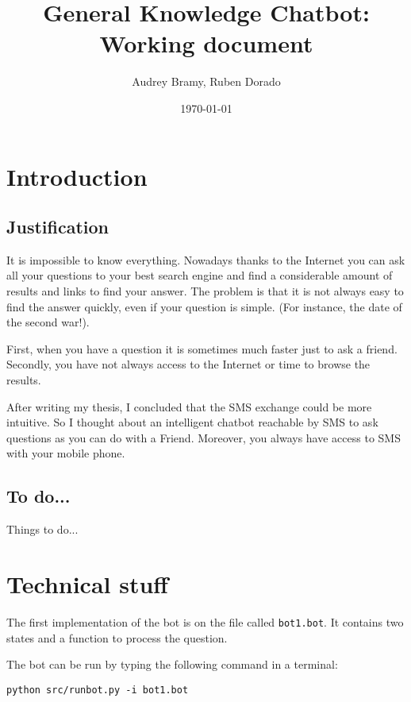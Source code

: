 \documentclass[11pt]{article}
\title{\textbf{General Knowledge Chatbot: Working document}}
\author{Audrey Bramy, Ruben Dorado}
\date{\today}
\begin{document}
\maketitle


\section{Introduction}


\subsection{Justification}

It is impossible to know everything. Nowadays thanks to the Internet you can ask all your questions to your best search engine and find a considerable amount of results and links to find your answer. The problem is that it is not always easy to find the answer quickly, even if your question is simple.
(For instance, the date of the second war!).

First, when you have a question it is sometimes much faster just to ask a friend. Secondly, you have not always access to the Internet or time to browse the results.

After writing my thesis, I concluded that the SMS exchange could be more intuitive. So I thought about an intelligent chatbot reachable by SMS to ask questions as you can do with a Friend. Moreover, you always have access to SMS with your mobile phone.


\subsection{To do...}

Things to do...

\section{Technical stuff}



The first implementation of the bot is on the file called \texttt{bot1.bot}. It contains two states and a function to process the question.

The bot can be run by typing the following command in a terminal:

\texttt{python src/runbot.py -i bot1.bot}




\end{document}
